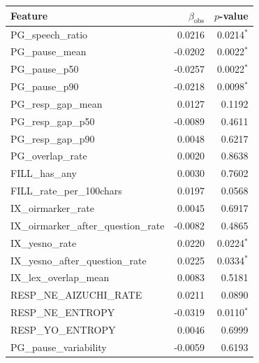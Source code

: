 \begin{tabular}{lrr}
\toprule
Feature & $\beta_{\mathrm{obs}}$ & $p$-value \\
\midrule
PG\_speech\_ratio & 0.0216 & 0.0214$^{*}$ \\
PG\_pause\_mean & -0.0202 & 0.0022$^{*}$ \\
PG\_pause\_p50 & -0.0257 & 0.0022$^{*}$ \\
PG\_pause\_p90 & -0.0218 & 0.0098$^{*}$ \\
PG\_resp\_gap\_mean & 0.0127 & 0.1192 \\
PG\_resp\_gap\_p50 & -0.0089 & 0.4611 \\
PG\_resp\_gap\_p90 & 0.0048 & 0.6217 \\
PG\_overlap\_rate & 0.0020 & 0.8638 \\
FILL\_has\_any & 0.0030 & 0.7602 \\
FILL\_rate\_per\_100chars & 0.0197 & 0.0568 \\
IX\_oirmarker\_rate & 0.0045 & 0.6917 \\
IX\_oirmarker\_after\_question\_rate & -0.0082 & 0.4865 \\
IX\_yesno\_rate & 0.0220 & 0.0224$^{*}$ \\
IX\_yesno\_after\_question\_rate & 0.0225 & 0.0334$^{*}$ \\
IX\_lex\_overlap\_mean & 0.0083 & 0.5181 \\
RESP\_NE\_AIZUCHI\_RATE & 0.0211 & 0.0890 \\
RESP\_NE\_ENTROPY & -0.0319 & 0.0110$^{*}$ \\
RESP\_YO\_ENTROPY & 0.0046 & 0.6999 \\
PG\_pause\_variability & -0.0059 & 0.6193 \\
\bottomrule
\end{tabular}
